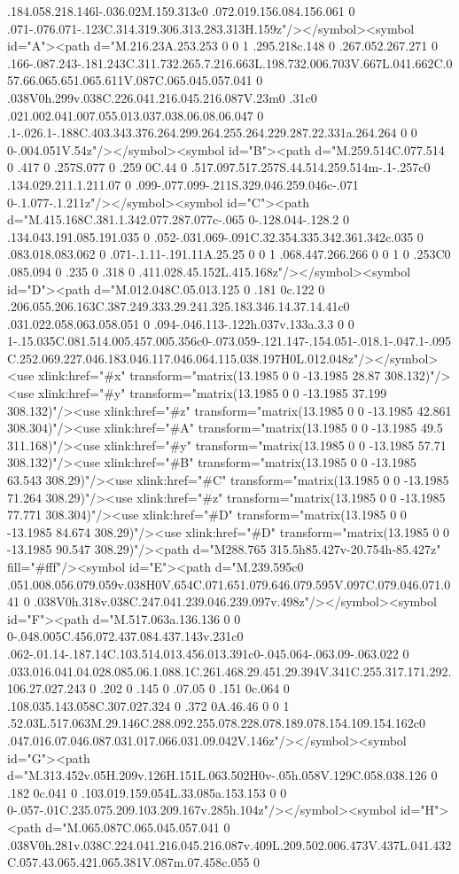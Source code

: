 .184.058.218.146l-.036.02M.159.313c0 .072.019.156.084.156.061 0 .071-.076.071-.123C.314.319.306.313.283.313H.159z"/></symbol><symbol id="A"><path d="M.216.23A.253.253 0 0 1 .295.218c.148 0 .267.052.267.271 0 .166-.087.243-.181.243C.311.732.265.7.216.663L.198.732.006.703V.667L.041.662C.057.66.065.651.065.611V.087C.065.045.057.041 0 .038V0h.299v.038C.226.041.216.045.216.087V.23m0 .31c0 .021.002.041.007.055.013.037.038.06.08.06.047 0 .1-.026.1-.188C.403.343.376.264.299.264.255.264.229.287.22.331a.264.264 0 0 0-.004.051V.54z"/></symbol><symbol id="B"><path d="M.259.514C.077.514 0 .417 0 .257S.077 0 .259 0C.44 0 .517.097.517.257S.44.514.259.514m-.1-.257c0 .134.029.211.1.211.07 0 .099-.077.099-.211S.329.046.259.046c-.071 0-.1.077-.1.211z"/></symbol><symbol id="C"><path d="M.415.168C.381.1.342.077.287.077c-.065 0-.128.044-.128.2 0 .134.043.191.085.191.035 0 .052-.031.069-.091C.32.354.335.342.361.342c.035 0 .083.018.083.062 0 .071-.1.11-.191.11A.25.25 0 0 1 .068.447.266.266 0 0 1 0 .253C0 .085.094 0 .235 0 .318 0 .411.028.45.152L.415.168z"/></symbol><symbol id="D"><path d="M.012.048C.05.013.125 0 .181 0c.122 0 .206.055.206.163C.387.249.333.29.241.325.183.346.14.37.14.41c0 .031.022.058.063.058.051 0 .094-.046.113-.122h.037v.133a.3.3 0 0 1-.15.035C.081.514.005.457.005.356c0-.073.059-.121.147-.154.051-.018.1-.047.1-.095C.252.069.227.046.183.046.117.046.064.115.038.197H0L.012.048z"/></symbol><use xlink:href="#x" transform="matrix(13.1985 0 0 -13.1985 28.87 308.132)"/><use xlink:href="#y" transform="matrix(13.1985 0 0 -13.1985 37.199 308.132)"/><use xlink:href="#z" transform="matrix(13.1985 0 0 -13.1985 42.861 308.304)"/><use xlink:href="#A" transform="matrix(13.1985 0 0 -13.1985 49.5 311.168)"/><use xlink:href="#y" transform="matrix(13.1985 0 0 -13.1985 57.71 308.132)"/><use xlink:href="#B" transform="matrix(13.1985 0 0 -13.1985 63.543 308.29)"/><use xlink:href="#C" transform="matrix(13.1985 0 0 -13.1985 71.264 308.29)"/><use xlink:href="#z" transform="matrix(13.1985 0 0 -13.1985 77.771 308.304)"/><use xlink:href="#D" transform="matrix(13.1985 0 0 -13.1985 84.674 308.29)"/><use xlink:href="#D" transform="matrix(13.1985 0 0 -13.1985 90.547 308.29)"/><path d="M288.765 315.5h85.427v-20.754h-85.427z" fill="#fff"/><symbol id="E"><path d="M.239.595c0 .051.008.056.079.059v.038H0V.654C.071.651.079.646.079.595V.097C.079.046.071.041 0 .038V0h.318v.038C.247.041.239.046.239.097v.498z"/></symbol><symbol id="F"><path d="M.517.063a.136.136 0 0 0-.048.005C.456.072.437.084.437.143v.231c0 .062-.01.14-.187.14C.103.514.013.456.013.391c0-.045.064-.063.09-.063.022 0 .033.016.041.04.028.085.06.1.088.1C.261.468.29.451.29.394V.341C.255.317.171.292.106.27.027.243 0 .202 0 .145 0 .07.05 0 .151 0c.064 0 .108.035.143.058C.307.027.324 0 .372 0A.46.46 0 0 1 .52.03L.517.063M.29.146C.288.092.255.078.228.078.189.078.154.109.154.162c0 .047.016.07.046.087.031.017.066.031.09.042V.146z"/></symbol><symbol id="G"><path d="M.313.452v.05H.209v.126H.151L.063.502H0v-.05h.058V.129C.058.038.126 0 .182 0c.041 0 .103.019.159.054L.33.085a.153.153 0 0 0-.057-.01C.235.075.209.103.209.167v.285h.104z"/></symbol><symbol id="H"><path d="M.065.087C.065.045.057.041 0 .038V0h.281v.038C.224.041.216.045.216.087v.409L.209.502.006.473V.437L.041.432C.057.43.065.421.065.381V.087m.07.458c.055 0 